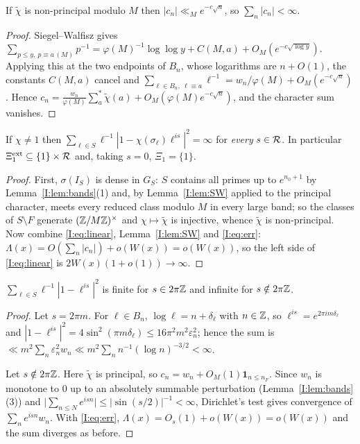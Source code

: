 \begin{lemma}\label{I:lem:SW}
If $\tilde\chi$ is non-principal modulo $M$ then $|c_n|\ll_M e^{-c\sqrt n}$, so
$\sum_n|c_n|<\infty$.
\end{lemma}

\begin{proof}
Siegel--Walfisz gives
$\sum_{p\le y,\ p\equiv a\,(M)}p^{-1}=\varphi(M)^{-1}\log\log y+C(M,a)+O_M(e^{-c\sqrt{\log y}})$.
Applying this at the two endpoints of $B_n$, whose logarithms are $n+O(1)$, the constants
$C(M,a)$ cancel and
$\sum_{\ell\in B_n,\ \ell\equiv a}\ell^{-1}=w_n/\varphi(M)+O_M(e^{-c\sqrt n})$. Hence
$c_n=\frac{w_n}{\varphi(M)}\sum_a^{*}\tilde\chi(a)+O_M(\varphi(M)e^{-c\sqrt n})$,
and the character sum vanishes.
\end{proof}

\begin{proposition}\label{I:prop:chinontriv}
If $\chi\ne1$ then $\sum_{\ell\in S}\ell^{-1}|1-\chi(\sigma_\ell)\ell^{is}|^2=\infty$ for
\emph{every} $s\in\mathcal{R}$. In particular $\Xi^{\mathrm{ext}}_1\subseteq\{1\}\times\mathcal{R}$ and, taking
$s=0$, $\Xi_1=\{1\}$.
\end{proposition}

\begin{proof}
First, $\sigma(I_S)$ is dense in $G_S$: $S$ contains all primes up to $e^{n_0+1}$ by
Lemma~\ref{I:lem:bands}(1) and, by Lemma~\ref{I:lem:SW} applied to the principal character, meets
every reduced class modulo $M$ in every large band; so the classes of $S\setminus F$ generate
$(\mathbb{Z}/M\mathbb{Z})^\times$ and $\chi\mapsto\tilde\chi$ is injective, whence $\tilde\chi$ is
non-principal. Now combine \eqref{I:eq:linear}, Lemma~\ref{I:lem:SW} and \eqref{I:eq:err}:
$\Lambda(x)=O(\sum_n|c_n|)+o(W(x))=o(W(x))$, so the left side of \eqref{I:eq:linear} is
$2W(x)(1+o(1))\to\infty$.
\end{proof}

\begin{proposition}\label{I:prop:trivialchi}
$\sum_{\ell\in S}\ell^{-1}|1-\ell^{is}|^2$ is finite for $s\in2\pi\mathbb{Z}$ and infinite for
$s\notin2\pi\mathbb{Z}$.
\end{proposition}

\begin{proof}
Let $s=2\pi m$. For $\ell\in B_n$, $\log\ell=n+\delta_\ell$ with $n\in\mathbb{Z}$, so
$\ell^{is}=e^{2\pi im\delta_\ell}$ and
$|1-\ell^{is}|^2=4\sin^2(\pi m\delta_\ell)\le16\pi^2m^2\varepsilon_n^2$; hence the sum is
$\ll m^2\sum_n\varepsilon_n^2w_n\ll m^2\sum_n n^{-1}(\log n)^{-3/2}<\infty$.

Let $s\notin2\pi\mathbb{Z}$. Here $\tilde\chi$ is principal, so $c_n=w_n+O_M(1)\mathbf 1_{n\le n_F}$.
Since $w_n$ is monotone to $0$ up to an absolutely summable perturbation
(Lemma~\ref{I:lem:bands}(3)) and
$\bigl|\sum_{n\le N}e^{isn}\bigr|\le|\sin(s/2)|^{-1}<\infty$, Dirichlet's test gives
convergence of $\sum_ne^{isn}w_n$. With \eqref{I:eq:err}, $\Lambda(x)=O_s(1)+o(W(x))=o(W(x))$
and the sum diverges as before.
\end{proof}

